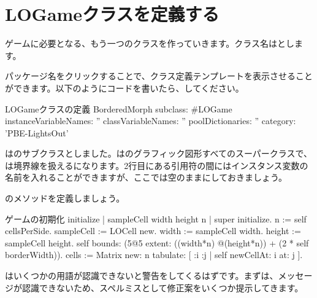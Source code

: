\documentclass[a4paper,10pt,twoside]{book}
\begin{document}

\section{LOGameクラスを定義する}

ゲームに必要となる、もう一つのクラスを作っていきます。クラス名はとします。


パッケージ名をクリックすることで、クラス定義テンプレートを表示させることができます。以下のようにコードを書いたら、してください。

\begin{classdef}[sbegame]{LOGameクラスの定義}
BorderedMorph subclass: #LOGame
   instanceVariableNames: ''
   classVariableNames: ''
   poolDictionaries: ''
   category: 'PBE-LightsOut'
\end{classdef}

はのサブクラスとしました。は\pharo のグラフィック図形すべてのスーパークラスで、は境界線を扱えるになります。2行目にある引用符の間にはインスタンス変数の名前を入れることができますが、ここでは空のままにしておきましょう。

のメソッドを定義しましょう。


\begin{numMethod}[sbegameinitialize]{ゲームの初期化}
initialize
   | sampleCell width height n |
   super initialize.
   n := self cellsPerSide.
   sampleCell := LOCell new.
   width := sampleCell width.
   height := sampleCell height.
   self bounds: (5@5 extent: ((width*n) @(height*n)) + (2 * self borderWidth)).
   cells := Matrix new: n tabulate: [ :i :j | self newCellAt: i at: j ].
\end{numMethod}


\pharo はいくつかの用語が認識できないと警告をしてくるはずです。まず\pharo は、メッセージが認識できないため、スペルミスとして修正案をいくつか提示してきます。
\end{document}
